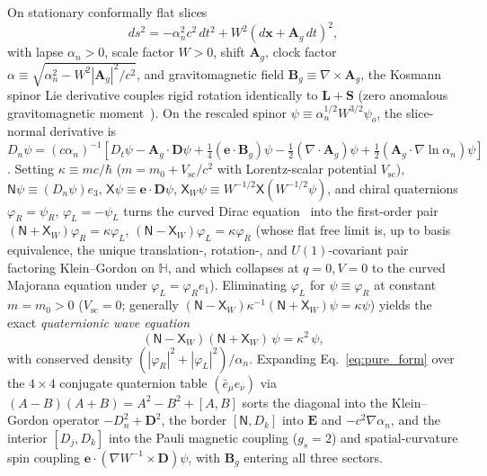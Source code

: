 \documentclass[aps,prl,reprint,superscriptaddress,nofootinbib,floatfix]{revtex4-2}
\theoremstyle{prlthm}
\begin{document}
On stationary conformally flat slices
\begin{equation}
  ds^2=-\alpha_n^2c^2\,dt^2+W^2(d\mathbf{x}+\mathbf{A}_g\,dt)^2,
  \label{eq:conformal_metric}
\end{equation}
with lapse $\alpha_n>0$, scale factor $W>0$, shift $\mathbf{A}_g$, clock factor $\alpha\equiv\sqrt{\alpha_n^2-W^2|\mathbf{A}_g|^2/c^2}$, and gravitomagnetic field $\mathbf{B}_g\equiv\nabla\times\mathbf{A}_g$, the Kosmann spinor Lie derivative couples rigid rotation identically to $\mathbf{L}+\mathbf{S}$ (zero anomalous gravitomagnetic moment~\citep{KobzarevOkun1963Gravitational}). On the rescaled spinor $\psi\equiv\alpha_n^{1/2}W^{3/2}\psi_o$, the slice-normal derivative is $D_n\psi=(c\alpha_n)^{-1}[D_t\psi-\mathbf{A}_g\cdot\mathbf{D}\psi+\tfrac{1}{4}(\mathbf{e}\cdot\mathbf{B}_g)\psi-\tfrac{1}{2}(\nabla\cdot\mathbf{A}_g)\psi+\tfrac{1}{2}(\mathbf{A}_g\cdot\nabla\ln\alpha_n)\psi]$. Setting $\kappa\equiv mc/\hbar$ ($m=m_0+V_\text{sc}/c^2$ with Lorentz-scalar potential $V_\text{sc}$), $\mathsf{N}\psi\equiv(D_n\psi)e_3$, $\mathsf{X}\psi\equiv\mathbf{e}\cdot\mathbf{D}\psi$, $\mathsf{X}_W\psi\equiv W^{-1/2}\mathsf{X}(W^{-1/2}\psi)$, and chiral quaternions $\varphi_R=\psi_R$, $\varphi_L=-\psi_L$ turns the curved Dirac equation~\citep{ObukhovSilenkoTeryaev2011Dirac} into the first-order pair $(\mathsf{N}+\mathsf{X}_W)\varphi_R=\kappa\varphi_L$, $(\mathsf{N}-\mathsf{X}_W)\varphi_L=\kappa\varphi_R$ (whose flat free limit is, up to basis equivalence, the unique translation-, rotation-, and $U(1)$-covariant pair factoring Klein--Gordon on $\mathbb{H}$, and which collapses at $q=0,V=0$ to the curved Majorana equation under $\varphi_L=\varphi_Re_1$). Eliminating $\varphi_L$ for $\psi\equiv\varphi_R$ at constant $m=m_0>0$ ($V_\text{sc}=0$; generally $(\mathsf{N}-\mathsf{X}_W)\kappa^{-1}(\mathsf{N}+\mathsf{X}_W)\psi=\kappa\psi$) yields the exact \emph{quaternionic wave equation}
\begin{equation}
  (\mathsf{N}-\mathsf{X}_W)(\mathsf{N}+\mathsf{X}_W)\,\psi=\kappa^2\,\psi,
  \label{eq:pure_form}
\end{equation}
with conserved density $(|\varphi_R|^2+|\varphi_L|^2)/\alpha_n$. Expanding Eq.~\eqref{eq:pure_form} over the $4\times 4$ conjugate quaternion table $(\bar{e}_\mu e_\nu)$ via $(A-B)(A+B)=A^2-B^2+[A,B]$ sorts the diagonal into the Klein--Gordon operator $-D_n^2+\mathbf{D}^2$, the border $[\mathsf{N},D_k]$ into $\mathbf{E}$ and $-c^2\nabla\alpha_n$, and the interior $[D_j,D_k]$ into the Pauli magnetic coupling ($g_s=2$) and spatial-curvature spin coupling $\mathbf{e}\cdot(\nabla W^{-1}\times\mathbf{D})\psi$, with $\mathbf{B}_g$ entering all three sectors.
\end{document}
